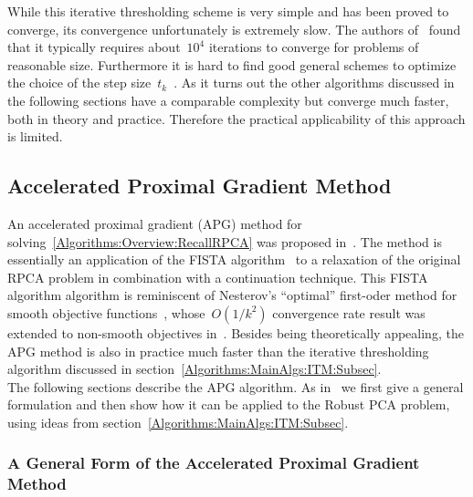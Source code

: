 \documentclass{../../common/projectreport}
\begin{document}
While this iterative thresholding scheme is very simple and has been proved to converge, its convergence unfortunately is extremely slow. The authors of~\cite{Wright:2009fk} found that it typically requires about~$10^4$ iterations to converge for problems of reasonable size. Furthermore it is hard to find good general schemes to optimize the choice of the step size~$t_k$~\cite{Lin:2010fk}. As it turns out the other algorithms discussed in the following sections have a comparable complexity but converge much faster, both in theory and practice. Therefore the practical applicability of this approach is limited.


\subsection{Accelerated Proximal Gradient Method}
\label{Algorithms:MainAlgs:PGM:Subsec}

An accelerated proximal gradient (APG) method for solving~\eqref{Algorithms:Overview:RecallRPCA} was proposed in~\cite{Lin:2009kx}. The method is essentially an application of the FISTA algorithm~\cite{Beck:2009kx} to a relaxation of the original RPCA problem in combination with a continuation technique. This FISTA algorithm algorithm is reminiscent of Nesterov's ``optimal'' first-oder method for smooth objective functions~\cite{Nesterov:1983uq}, whose~$O(1/k^2)$ convergence rate result was extended to non-smooth objectives in~\cite{Nesterov:2007kx}. Besides being theoretically appealing, the APG method is also in practice much faster than the iterative thresholding algorithm discussed in section~\ref{Algorithms:MainAlgs:ITM:Subsec}.\\

The following sections describe the APG algorithm. As in~\cite{Lin:2009kx} we first give a general formulation and then show how it can be applied to the Robust PCA problem, using ideas from section~\ref{Algorithms:MainAlgs:ITM:Subsec}.


\subsubsection{A General Form of the Accelerated Proximal Gradient Method}
\label{Algorithms:MainAlgs:PGM:General:Subsubsec}
\end{document}

